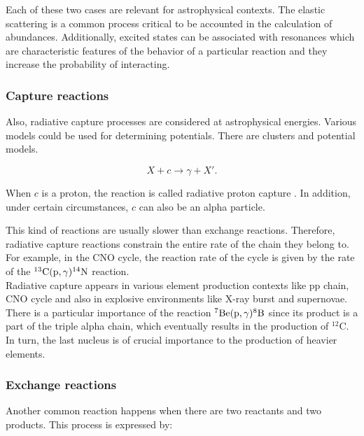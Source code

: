 \documentclass[openany]{book}
\begin{document}
Each of these two cases are relevant for astrophysical contexts. The elastic scattering is a common process critical to be accounted in the calculation of abundances. Additionally, excited states can be associated with resonances which are characteristic features of the behavior of a particular reaction and they increase the probability of interacting. \\

\subsubsection{Capture reactions} \label{ssub:captureReactions}

Also, radiative capture processes are considered at astrophysical energies. Various models could be used for determining potentials. There are clusters and potential models.

\begin{equation}  \label{eq:nuclearReaction_capture}
	X + c \rightarrow  \gamma + X'.
\end{equation}

When $c$ is a proton, the reaction is called radiative proton capture \cite{brune_davids_2015}. In addition, under certain circumstances, $c$ can also be an alpha particle. 

This kind of reactions are usually slower than exchange reactions. Therefore, radiative capture reactions constrain the entire rate of the chain they belong to. For example, in the CNO cycle, the reaction rate of the cycle is given by the rate of the $\mathrm{{}^{13}C(p, \gamma){}^{14}N}$ reaction. \\

Radiative capture appears in various element production contexts like pp chain, CNO cycle and also in explosive environments like X-ray burst and supernovae. There is a particular importance of the reaction $\mathrm{{}^{7}Be(p, \gamma){}^{8}B}$ since its product is a part of the triple alpha chain, which eventually results in the production of $\mathrm{{}^{12}C}$. In turn, the last nucleus is of crucial importance to the production of heavier elements. 

\subsubsection{Exchange reactions}  \label{ssub:exchangeReactions}

Another common reaction happens when there are two reactants and two products. This process is expressed by:
\end{document}
